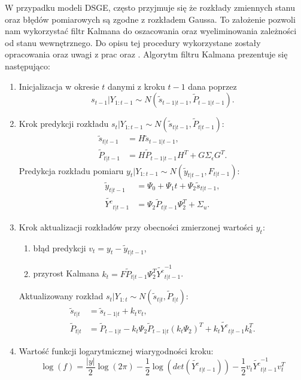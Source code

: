 W przypadku modeli DSGE, często przyjmuje się że rozkłady zmiennych stanu oraz błędów pomiarowych są zgodne z rozkładem Gaussa. To założenie pozwoli nam wykorzystać filtr Kalmana do oszacowania oraz wyeliminowania zależności od stanu wewnętrznego. Do opisu tej procedury wykorzystane zostały opracowania oraz uwagi z prac \cite{herbst} oraz \cite{laaraiedh2012implementation}. Algorytm filtru Kalmana prezentuje się następująco:
\begin{algDefinition}
\begin{enumerate}
    \item Inicjalizacja w okresie $t$ danymi z kroku $t-1$ dana poprzez 
    \begin{equation}
        s_{t-1}|Y_{1:t-1} \sim N(\tilde{s}_{t-1|t-1},\tilde{P}_{t-1|t-1}).
    \end{equation}
    \item Krok predykcji rozkładu $s_t|Y_{1:t-1} \sim N(\tilde{s}_{t|t-1},\tilde{P}_{t|t-1})$:
    \begin{align}
        \tilde{s}_{t|t-1} &= H \tilde{s}_{t-1|t-1}, \\
        \tilde{P}_{t|t-1} &= H \tilde{P}_{t-1|t-1} H^T + G \Sigma_{\epsilon} G^T.
    \end{align}
    Predykcja rozkładu pomiaru $y_t|Y_{1:t-1} \sim N(\tilde{y}_{t|t-1},F_{t|t-1})$:
    \begin{align}
        \tilde{y}_{t|t-1} &= \Psi_0 + \Psi_1 t + \Psi_2\tilde{s}_{t|t-1},\\
        \tilde{Y^{c}}_{t|t-1} &= \Psi_2\tilde{P}_{t|t-1}\Psi_2^T + \Sigma_{u}.
    \end{align}
    \item Krok aktualizacji rozkładów przy obecności zmierzonej wartości $y_t$:
    \begin{enumerate}
        \item błąd predykcji $v_t = y_t - \tilde{y}_{t|t-1}$,
        \item przyrost Kalmana $k_t = F \tilde{P}_{t|t-1} \Psi_2^T \tilde{Y^{c}}_{t|t-1}^{-1}$.
    \end{enumerate}
    Aktualizowany rozkład $s_{t}|Y_{1:t} \sim N(\tilde{s}_{t|t},\tilde{P}_{t|t})$:
        \begin{align}
            \tilde{s}_{t|t} &= \tilde{s}_{t-1|t} + k_t v_t,\\
            \tilde{P}_{t|t} &= \tilde{P}_{t-1|t} - k_t \Psi_2 \tilde{P}_{t-1|t} \left(k_t \Psi_2\right)^T  + k_t \tilde{Y^{c}}_{t|t-1} k_k^T.
        \end{align}
    \item Wartość funkcji logarytmicznej wiarygodności kroku:
        \begin{equation}
            \log{(f)} = \frac{|y|}{2}\log{(2\pi)} - \frac{1}{2}\log{(det(\tilde{Y^{c}}_{t|t-1}))} - \frac{1}{2} v_t \tilde{Y^{c}}_{t|t-1}^{-1} v_t^T
        \end{equation}
\end{enumerate}
\end{algDefinition}
